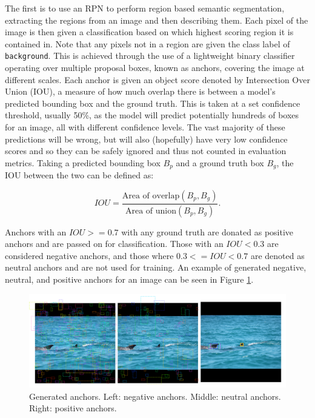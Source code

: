 The first is to use an RPN to perform region based semantic segmentation, extracting the regions from an image and then describing them. Each pixel of the image is then given a classification based on which highest scoring region it is contained in. Note that any pixels not in a region are given the class label of \texttt{background}. This is achieved through the use of a lightweight binary classifier operating over multiple proposal boxes, known as anchors, covering the image at different scales. Each anchor is given an object score denoted by Intersection Over Union (IOU), a measure of how much overlap there is between a model's predicted bounding box and the ground truth. This is taken at a set confidence threshold, usually 50\%, as the model will predict potentially hundreds of boxes for an image, all with different confidence levels. The vast majority of these predictions will be wrong, but will also (hopefully) have very low confidence scores and so they can be safely ignored and thus not counted in evaluation metrics. Taking a predicted bounding box $B_p$ and a ground truth box $B_g$, the IOU between the two can be defined as:

\begin{equation}
IOU = \frac{\text{Area of overlap}(B_p, B_g)}{\text{Area of union}(B_p, B_g)}.
\end{equation}

Anchors with an $IOU >= 0.7$ with any ground truth are donated as positive anchors and are passed on for classification. Those with an $IOU < 0.3$ are considered negative anchors, and those where $0.3 <= IOU < 0.7$ are denoted as neutral anchors and are not used for training. An example of generated negative, neutral, and positive anchors for an image can be seen in Figure \ref{fig:anchor-types}.

\begin{figure}
	\begin{center}
		\includegraphics[scale=0.25]{Chapter2/figs/anchor-types.png}
	\end{center}
	\caption{Generated anchors. Left: negative anchors. Middle: neutral anchors. Right: positive anchors.}
	\label{fig:anchor-types}
\end{figure}

